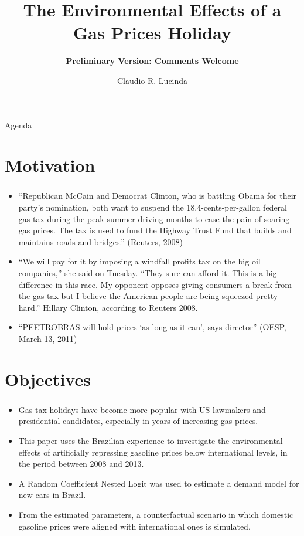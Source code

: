 \documentclass{beamer}
\title{The Environmental Effects of a Gas Prices Holiday}
\subtitle{\textbf{Preliminary Version: Comments Welcome}}
\author{Claudio R. Lucinda}
\institute{FEA-RP/USP}
\date{}
\begin{document}
\frame{\titlepage}
\begin{frame}{Agenda}
	\tableofcontents[pausesections]
\end{frame}

\section{Motivation}

\begin{frame}[fragile]\frametitle{\insertsection}
    \begin{itemize}
        \item ``Republican McCain and Democrat Clinton, who is battling Obama for their party’s nomination, both want to suspend the 18.4-cents-per-gallon federal gas tax during the peak summer driving months to ease the pain of soaring gas prices. The tax is used to fund the Highway Trust Fund that builds and maintains roads and bridges.'' (Reuters, 2008)
        \item ``We will pay for it by imposing a windfall profits tax on the big oil companies,'' she said on Tuesday. ``They sure can afford it. This is a big difference in this race. My opponent opposes giving consumers a break from the gas tax but I believe the American people are being squeezed pretty hard.'' Hillary Clinton, according to Reuters 2008.
        \item ``PEETROBRAS will hold prices `as long as it can', says director'' (OESP, March 13, 2011)
    \end{itemize}


\end{frame}

\section{Objectives}
\begin{frame}[fragile]\frametitle{\insertsection}
    \begin{itemize}
        \item Gas tax holidays have become more popular with US lawmakers and presidential candidates, especially in years of increasing gas prices. 
        \item This paper uses the Brazilian experience to investigate the environmental effects of artificially repressing gasoline prices below international levels, in the period between 2008 and 2013. 
        \item A Random Coefficient Nested Logit was used to estimate a demand model for new cars in Brazil. 
        \item From the estimated parameters, a counterfactual scenario in which domestic gasoline prices were aligned with international ones is simulated. 
    \end{itemize}


\end{frame}
\end{document}
